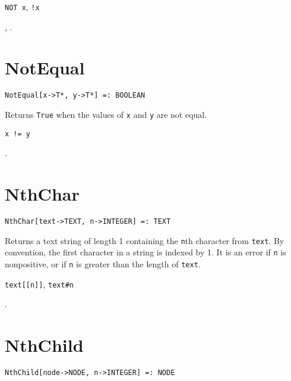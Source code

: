 
\shortform \verb+NOT x+, \verb+!x+

\seealso {}, .


\section*{NotEqual}\label{PrimNotEqual}
\begin{verbatim}
NotEqual[x->T*, y->T*] =: BOOLEAN
\end{verbatim}
\foralltypes

\noindent
Returns \verb+True+ when the values of \verb+x+ and \verb+y+ are
not equal.

\shortform \verb+x != y+

\seealso {}.


\section*{NthChar}\label{PrimNthChar}
\begin{verbatim}
NthChar[text->TEXT, n->INTEGER] =: TEXT 
\end{verbatim}

\noindent
Returns a text string of length 1 containing the \verb+n+th
character from \verb+text+.  By convention, the first character
in a string is indexed by 1.  It is an error if \verb+n+ is nonpositive,
or if \verb+n+ is greater than the length of \verb+text+.

\shortform \verb+text[[n]]+, \verb+text#n+

\seealso {}.


\section*{NthChild}\label{PrimNthChild}
\begin{verbatim} 
NthChild[node->NODE, n->INTEGER] =: NODE 
\end{verbatim}

